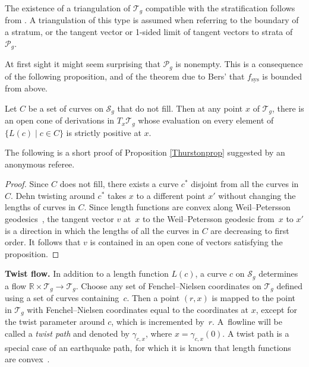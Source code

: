 The existence of a triangulation of $\mathcal{T}_{g}$ compatible with the stratification follows from \cite{Lojasiewicz1964}. A triangulation of this type is assumed when referring to the boundary of a stratum, or the tangent vector or 1-sided limit of tangent vectors to strata of $\mathcal{P}_{g}$.

At first sight it might seem surprising that $\mathcal{P}_{g}$ is nonempty. This is a consequence of the following proposition, and of the theorem due to Bers' \cite{Bers1985} that $f_{\mathrm{sys}}$ is bounded from above.

\begin{Proposition}
\label{Thurstonprop}
Let $C$ be a set of curves on $\mathcal{S}_{g}$ that do not fill. Then at any point $x$ of $\mathcal{T}_{g}$, there is an open cone of derivations in $T_{x}\mathcal{T}_{g}$ whose evaluation on every element of $\{L(c) \mid c\in C\}$ is strictly positive at $x$.
\end{Proposition}

The following is a short proof of Proposition \ref{Thurstonprop} suggested by an anonymous referee.

\begin{proof}
Since $C$ does not fill, there exists a curve $c^{*}$ disjoint from all the curves in $C$. Dehn twisting around $c^{*}$ takes $x$ to a different point $x'$ without changing the lengths of curves in $C$. Since length functions are convex along Weil--Petersson geodesics~\cite{Wolpert}, the tangent vector $v$ at~$x$ to the Weil--Petersson geodesic from~$x$ to $x'$ is a direction in which the lengths of all the curves in $C$ are decreasing to first order. It follows that $v$ is contained in an open cone of vectors satisfying the proposition.
\end{proof}

\textbf{Twist flow.} In addition to a length function $L(c)$, a curve $c$ on $\mathcal{S}_{g}$ determines a flow $\mathbb{R}\times \mathcal{T}_{g}\rightarrow \mathcal{T}_{g}$. Choose any set of Fenchel--Nielsen coordinates on $\mathcal{T}_{g}$ defined using a set of curves containing~$c$. Then a point $(r,x)$ is mapped to the point in $\mathcal{T}_{g}$ with Fenchel--Nielsen coordinates equal to the coordinates at $x$, except for the twist parameter around $c$, which is incremented by~$r$. A~flowline will be called a \textit{twist path} and denoted by $\gamma_{c, x}$, where $x=\gamma_{c,x}(0)$. A twist path is a special case of an earthquake path, for which it is known that length functions are convex~\cite{Kerckhoff}.

